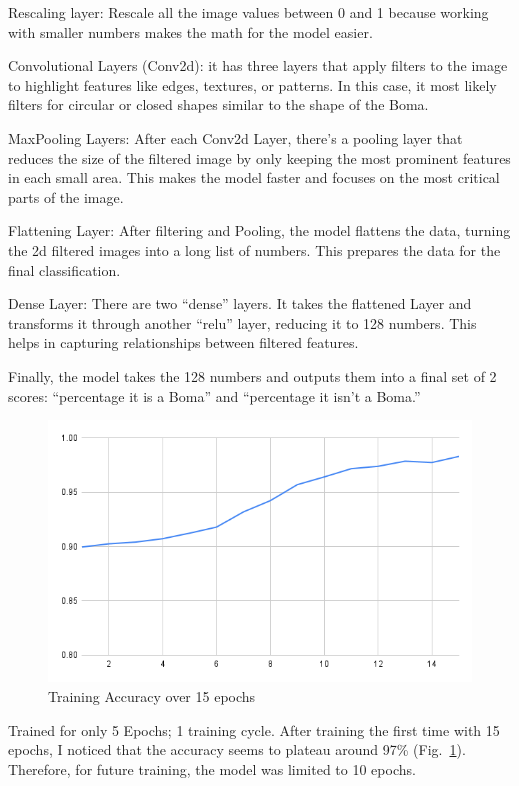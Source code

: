 \documentclass[10pt]{article}
\begin{document}
Rescaling layer: Rescale all the image values between 0 and 1 because working with smaller numbers makes the math for the model easier.

Convolutional Layers (Conv2d): it has three layers that apply filters to the image to highlight features like edges, textures, or patterns. In this case, it most likely filters for circular or closed shapes similar to the shape of the Boma.

MaxPooling Layers: After each Conv2d Layer, there's a pooling layer that reduces the size of the filtered image by only keeping the most prominent features in each small area. This makes the model faster and focuses on the most critical parts of the image.

Flattening Layer: After filtering and Pooling, the model flattens the data, turning the 2d filtered images into a long list of numbers. This prepares the data for the final classification.

Dense Layer: There are two “dense” layers. It takes the flattened Layer and transforms it through another “relu” layer, reducing it to 128 numbers. This helps in capturing relationships between filtered features.

Finally, the model takes the 128 numbers and outputs them into a final set of 2 scores: “percentage it is a Boma” and “percentage it isn't a Boma.”

\begin{figure}
    \centering
    \includegraphics[width=1\linewidth]{images/Training Accuracy over 15 epochs.png}
    \caption{Training Accuracy over 15 epochs}
    \label{fig:Training_Accuracy}
\end{figure}

Trained for only 5 Epochs; 1 training cycle. After training the first time with 15 epochs, I noticed that the accuracy seems to plateau around 97\% (Fig.~\ref{fig:Training_Accuracy}). Therefore, for future training, the model was limited to 10 epochs.
\end{document}
